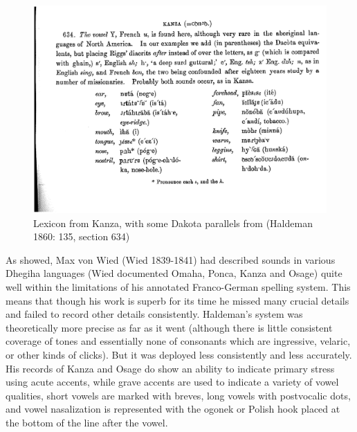 \documentclass[output=paper]{LSP/langsci}
\begin{document}
\begin{figure}
\centering
\caption{Lexicon from Kanza, with some Dakota parallels from \citet{Riggs1852}  (Haldeman 1860: 135, section 634)} \label{haldemanlexicon}
\includegraphics[width=5in]{figures/GrantKanzaWords}
\end{figure}

As \citet{Rankin1994} showed, Max von Wied (Wied 1839-1841) had described sounds in various Dhegiha languages (Wied documented Omaha, Ponca, Kanza and Osage) quite well within the limitations of his annotated Franco-German spelling system. This means that though his work is superb for its time he missed many crucial details and failed to record other details consistently.   Haldeman's system was theoretically more precise as far as it went (although there is little consistent coverage of tones and essentially none of consonants which are ingressive, velaric, or other kinds of clicks). But it was deployed less consistently and less accurately.   His records of Kanza and Osage do show an ability to indicate primary stress using acute accents, while grave accents are used to indicate a variety of vowel qualities, short vowels are marked with breves, long vowels with postvocalic dots, and vowel nasalization is represented with the ogonek or Polish hook placed at the bottom of the line after the vowel.  
\end{document}
